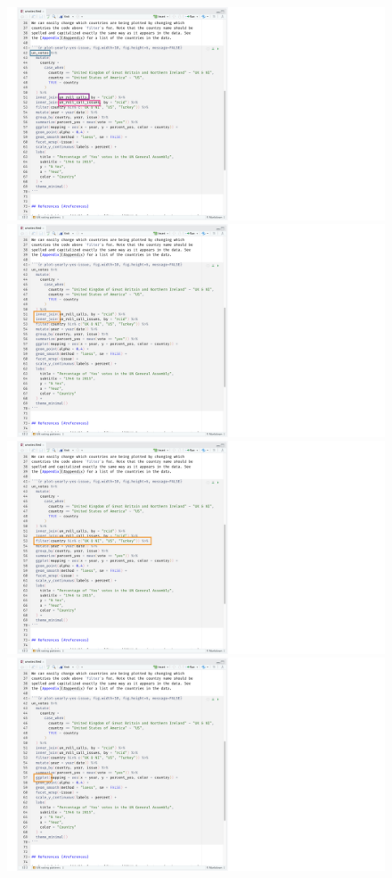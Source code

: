\documentclass[11pt]{beamer}
\begin{document}
	\begin{frame}
		\begin{figure}
			\vspace{1em}
			\begin{overprint}
				\centering\includegraphics[width=.9\linewidth]{Images/S1/unvotes/unvotes-08}
				\onslide<2>\centering\includegraphics[width=0.9\linewidth]{Images/S1/unvotes/unvotes-09}
				\onslide<3>\centering\includegraphics[width=0.9\linewidth]{Images/S1/unvotes/unvotes-10}
				\onslide<4>\centering\includegraphics[width=0.9\linewidth]{Images/S1/unvotes/unvotes-11}

\end{overprint}
\end{figure}
\end{frame}
\end{document}
